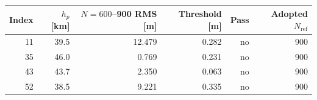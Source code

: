\begin{tabular}{rrrrrr}
\toprule
Index & $h_p$ [km] & $N=600$--900 RMS [m] & Threshold [m] & Pass & Adopted $N_{\mathrm{ref}}$ \\
\midrule
11 & 39.5 & 12.479 & 0.282 & no & 900 \\
35 & 46.0 & 0.769 & 0.231 & no & 900 \\
43 & 43.7 & 2.350 & 0.063 & no & 900 \\
52 & 38.5 & 9.221 & 0.335 & no & 900 \\
\bottomrule
\end{tabular}
